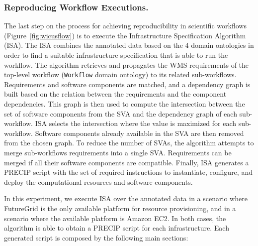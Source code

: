 \documentclass[final,5p,times,twocolumn]{elsarticle}
\begin{document}
\subsubsection{Reproducing Workflow Executions.}

The last step on the process for achieving reproducibility in scientific workflows (Figure~\ref{fig:wicusflow}) is to execute the Infrastructure Specification Algorithm (ISA). The ISA combines the annotated data based on the 4 domain ontologies in order to find a suitable infrastructure specification that is able to run the workflow. The algorithm retrieves and propagates the WMS requirements of the top-level workflow (\texttt{Workflow} domain ontology) to its related sub-workflows. Requirements and software components are matched, and a dependency graph is built based on the relation between the requirements and the component dependencies. This graph is then used to compute the intersection between the set of software components from the SVA and the dependency graph of each sub-workflow. ISA selects the intersection where the value is maximized for each sub-workflow. Software components already available in the SVA are then removed from the chosen graph. To reduce the number of SVAs, the algorithm attempts to merge sub-workflows requirements into a single SVA. Requirements can be merged if all their software components are compatible. Finally, ISA generates a PRECIP script with the set of required instructions to instantiate, configure, and deploy the computational resources and software components.


In this experiment, we execute ISA over the annotated data in a scenario where FutureGrid is the only available platform for resource provisioning, and in a scenario where the available platform is Amazon EC2. In both cases, the algorithm is able to obtain a PRECIP script for each infrastructure. Each generated script is composed by the following main sections:
\end{document}
